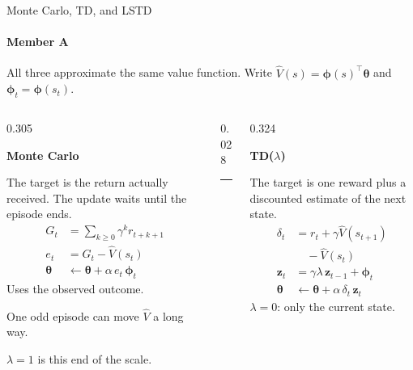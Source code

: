 \documentclass[aspectratio=169,11pt]{beamer}
\newcommand{\memberA}{Member A}
\newcommand{\speaker}[1]{\framesubtitle{#1}}
\newcommand{\vphi}{\bm{\phi}}
\newcommand{\vz}{\mathbf{z}}
\newcommand{\vth}{\bm{\theta}}
\begin{document}
\begin{frame}{Monte Carlo, TD, and LSTD}
  \speaker{\memberA}
  \scriptsize
  All three approximate the same value function. Write $\hat V(s)=\vphi(s)^\top\vth$ and $\vphi_t=\vphi(s_t)$.
  \vspace{0.2em}
  \setlength{\abovedisplayskip}{3pt}%
  \setlength{\belowdisplayskip}{3pt}%
  \begin{columns}[T,onlytextwidth]
    \begin{column}{0.305\textwidth}
      \begin{minipage}[t][4.35cm][t]{0.94\linewidth}
      \raggedright
      {\color{accent}\small\bfseries Monte Carlo}\par\vspace{0.28em}
      The target is the return actually received. The update waits until the episode ends.
      \begin{align*}
        G_t &= \textstyle\sum_{k\ge 0}\gamma^k r_{t+k+1}\\
        e_t &= G_t-\hat V(s_t)\\
        \vth &\leftarrow \vth+\alpha\,e_t\,\vphi_t
      \end{align*}
      Uses the observed outcome.\par
      One odd episode can move $\hat V$ a long way.\par
      $\lambda=1$ is this end of the scale.
      \end{minipage}
    \end{column}
    \begin{column}{0.028\textwidth}
      \centering\textcolor{hair}{\rule{0.7pt}{4.35cm}}
    \end{column}
    \begin{column}{0.324\textwidth}
      \begin{minipage}[t][4.35cm][t]{0.94\linewidth}
      \raggedright
      {\color{accent}\small\bfseries TD($\lambda$)}\par\vspace{0.28em}
      The target is one reward plus a discounted estimate of the next state.
      \begin{align*}
        \delta_t &= r_t+\gamma\hat V(s_{t+1})\\
                 &\quad {}-\hat V(s_t)\\
        \vz_t &= \gamma\lambda\,\vz_{t-1}+\vphi_t\\
        \vth &\leftarrow \vth+\alpha\,\delta_t\,\vz_t
      \end{align*}
      $\lambda=0$: only the current state.\par

\end{minipage}
\end{column}
\end{columns}
\end{frame}
\end{document}
